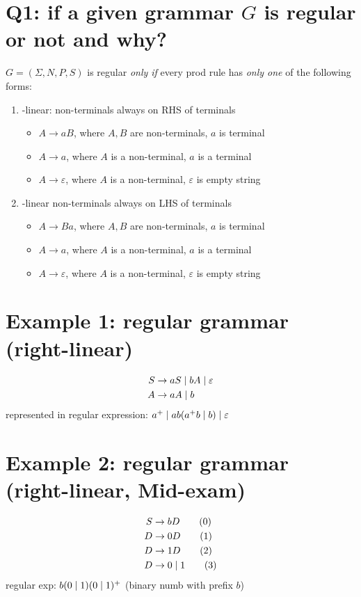 \documentclass[10pt,a4paper,landscape]{article}
\begin{document}
\pagestyle{empty}
\begin{multicols*}{3}
% 
% 
% 
\section*{Q1: if a given grammar $G$ is regular or not and why?}
$G=(\Sigma,N,P,S)$ is regular \emph{only if} every prod rule has \emph{only one} of the following forms:
\begin{enumerate}
\item {}-linear: non-terminals always on RHS of terminals
  \begin{itemize}
  \item $A\to aB$, where $A, B$ are non-terminals, $a$ is terminal
  \item $A\to a$, where $A$ is a non-terminal, $a$ is a terminal
  \item $A\to \varepsilon$, where $A$ is a non-terminal, $\varepsilon$ is empty string
  \end{itemize}
\item {}-linear non-terminals always on LHS of terminals
  \begin{itemize}
  \item $A\to Ba$, where $A, B$ are non-terminals, $a$ is terminal
  \item $A\to a$, where $A$ is a non-terminal, $a$ is a terminal
  \item $A\to \varepsilon$, where $A$ is a non-terminal, $\varepsilon$ is empty string
  \end{itemize}
\end{enumerate}
\section*{Example 1: regular grammar (right-linear)}
\begin{align*}
  S&\to aS \;|\; bA \;|\; \varepsilon\\
  A&\to aA \;|\; b
\end{align*}
represented in regular expression: $a^+\;|\; ab(a^+b\;|\; b)\;|\;\varepsilon$
\section*{Example 2: regular grammar (right-linear, Mid-exam)}
\begin{align*}
  S&\to bD \tag{0} \\
  D&\to 0D \tag{1} \\
  D&\to 1D \tag{2} \\
  D&\to 0 \;|\; 1 \tag{3}
\end{align*}
regular exp: $b(0\;|\; 1)(0\;|\; 1)^+$ (binary numb with prefix $b$)


\end{multicols*}
\end{document}
